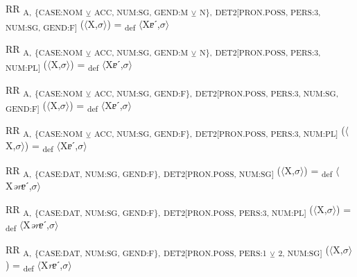 {\begin{exe}
 RR \textsubscript{A,} \textsubscript{\{CASE:NOM} \textsubscript{${\veebar}$}\textsubscript{ ACC, NUM:SG, GEND:M} \textsubscript{${\veebar}$}\textsubscript{ N\},} \textsubscript{DET2[PRON.POSS, PERS:3, NUM:SG, GEND:F]} ($\langle$X,$\sigma $$\rangle$) = \textsubscript{def} $\langle$X\textit{ɐ}ˊ,$\sigma $$\rangle$
\end{exe}

\begin{exe}
 RR \textsubscript{A,} \textsubscript{\{CASE:NOM} \textsubscript{${\veebar}$}\textsubscript{ ACC, NUM:SG, GEND:M} \textsubscript{${\veebar}$}\textsubscript{ N\},} \textsubscript{DET2[PRON.POSS, PERS:3, NUM:PL]} ($\langle$X,$\sigma $$\rangle$) = \textsubscript{def} $\langle$X\textit{ɐ}ˊ,$\sigma $$\rangle$
\end{exe}

\begin{exe}
 RR \textsubscript{A,} \textsubscript{\{CASE:NOM} \textsubscript{${\veebar}$}\textsubscript{ ACC, NUM:SG, GEND:F\},} \textsubscript{DET2[PRON.POSS, PERS:3, NUM:SG, GEND:F]} ($\langle$X,$\sigma $$\rangle$) = \textsubscript{def} $\langle$X\textit{ɐ}ˊ,$\sigma $$\rangle$
\end{exe}

\begin{exe}
 RR \textsubscript{A,} \textsubscript{\{CASE:NOM} \textsubscript{${\veebar}$}\textsubscript{ ACC, NUM:SG, GEND:F\},} \textsubscript{DET2[PRON.POSS, PERS:3, NUM:PL]} ($\langle$X,$\sigma $$\rangle$) = \textsubscript{def} $\langle$X\textit{ɐ}ˊ,$\sigma $$\rangle$
\end{exe}

\begin{exe}
 RR \textsubscript{A,} \textsubscript{\{CASE:DAT, NUM:SG, GEND:F\},} \textsubscript{DET2[PRON.POSS, NUM:SG]} ($\langle$X,$\sigma $$\rangle$) = \textsubscript{def} $\langle$X\textit{ərɐ}ˊ,$\sigma $$\rangle$
\end{exe}

\begin{exe}
 RR \textsubscript{A,} \textsubscript{\{CASE:DAT, NUM:SG, GEND:F\},} \textsubscript{DET2[PRON.POSS, PERS:3, NUM:PL]} ($\langle$X,$\sigma $$\rangle$) = \textsubscript{def} $\langle$X\textit{ərɐ}ˊ,$\sigma $$\rangle$
\end{exe}

\begin{exe}
 RR \textsubscript{A,} \textsubscript{\{CASE:DAT, NUM:SG, GEND:F\},} \textsubscript{DET2[PRON.POSS, PERS:1} \textsubscript{${\veebar}$}\textsubscript{ 2, NUM:SG]} ($\langle$X,$\sigma $$\rangle$) = \textsubscript{def} $\langle$X\textit{rɐ}ˊ,$\sigma $$\rangle$
\end{exe}

}

